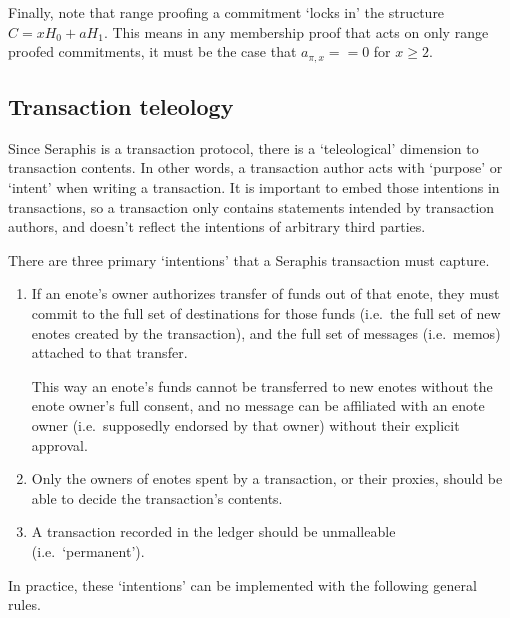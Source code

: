 Finally, note that range proofing a commitment `locks in' the structure $C = x H_0 + a H_1$. This means in any membership proof that acts on only range proofed commitments, it must be the case that $a_{\pi,x} == 0$ for $x \geq 2$.


\subsection{Transaction teleology}
\label{subsec:seraphis-tx-teleology}

Since Seraphis is a transaction protocol, there is a `teleological' dimension to transaction contents. In other words, a transaction author acts with `purpose' or `intent' when writing a transaction. It is important to embed those intentions in transactions, so a transaction only contains statements intended by transaction authors, and doesn't reflect the intentions of arbitrary third parties.

There are three primary `intentions' that a Seraphis transaction must capture.

\begin{enumerate}
    \item If an enote's owner authorizes transfer of funds out of that enote, they must commit to the full set of destinations for those funds (i.e.\ the full set of new enotes created by the transaction), and the full set of messages (i.e.\ memos) attached to that transfer.

    This way an enote's funds cannot be transferred to new enotes without the enote owner's full consent, and no message can be affiliated with an enote owner (i.e.\ supposedly endorsed by that owner) without their explicit approval.

    \item Only the owners of enotes spent by a transaction, or their proxies, should be able to decide the transaction's contents.

    \item A transaction recorded in the ledger should be unmalleable (i.e.\ `permanent').
\end{enumerate}

In practice, these `intentions' can be implemented with the following general rules.

